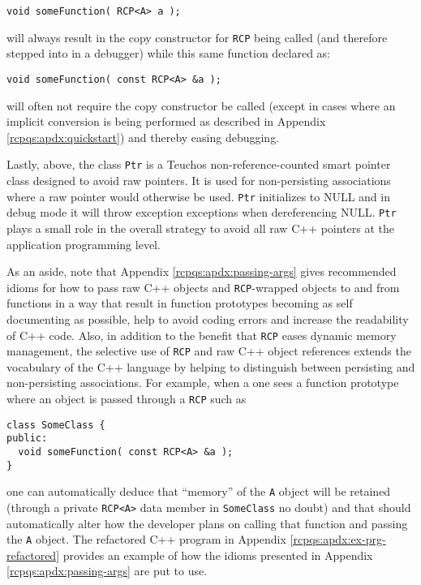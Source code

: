 \documentclass[pdf,ps2pdf,11pt]{SANDreport}
\begin{document}
{\small\begin{verbatim}
void someFunction( RCP<A> a );
\end{verbatim}}

{}\noindent{}will always result in the copy constructor for
{}\texttt{RCP} being called (and therefore stepped into
in a debugger) while this same function declared as:

{\small\begin{verbatim}
void someFunction( const RCP<A> &a );
\end{verbatim}}

{}\noindent{}will often not require the copy constructor be called
(except in cases where an implicit conversion is being performed as
described in Appendix {}\ref{rcpqs:apdx:quickstart}) and thereby
easing debugging.

Lastly, above, the class {}\texttt{Ptr} is a Teuchos non-reference-counted
smart pointer class designed to avoid raw pointers.  It is used for
non-persisting associations where a raw pointer would otherwise be used.
{}\texttt{Ptr} initializes to NULL and in debug mode it will throw exception
exceptions when dereferencing NULL.  {}\texttt{Ptr} plays a small role in the
overall strategy to avoid all raw C++ pointers at the application programming
level.

As an aside, note that Appendix {}\ref{rcpqs:apdx:passing-args} gives
recommended idioms for how to pass raw C++ objects and
{}\texttt{RCP}-wrapped objects to and from functions in
a way that result in function prototypes becoming as self documenting
as possible, help to avoid coding errors and increase the readability
of C++ code.  Also, in addition to the benefit that
{}\texttt{RCP} eases dynamic memory management, the
selective use of {}\texttt{RCP} and raw C++ object
references extends the vocabulary of the C++ language by helping to
distinguish between persisting and non-persisting associations.  For
example, when a one sees a function prototype where an object is
passed through a {}\texttt{RCP} such as

{\small\begin{verbatim}
class SomeClass {
public:
  void someFunction( const RCP<A> &a );
}
\end{verbatim}}

{}\noindent{}one can automatically deduce that ``memory'' of the
{}\texttt{A} object will be retained (through a private
{}\texttt{RCP<A>} data member in {}\texttt{Some\-Class} no
doubt) and that should automatically alter how the developer plans on
calling that function and passing the {}\texttt{A} object.  The
refactored C++ program in Appendix
{}\ref{rcpqs:apdx:ex-prg-refactored} provides an example of how the
idioms presented in Appendix {}\ref{rcpqs:apdx:passing-args} are put
to use.
\end{document}
